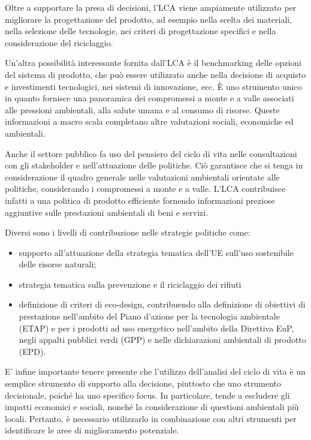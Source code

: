 Oltre a supportare la presa di decisioni, l'LCA viene ampiamente utilizzato per migliorare la progettazione del prodotto, ad esempio nella scelta dei materiali, nella selezione delle tecnologie, nei criteri di progettazione specifici e nella considerazione del riciclaggio.

Un'altra possibilità interessante fornita dall'LCA è il benchmarking delle opzioni del sistema di prodotto, che può essere utilizzato anche nella decisione di acquisto e investimenti tecnologici, nei sistemi di innovazione, ecc. È uno strumento unico in quanto fornisce una panoramica dei compromessi a monte e a valle associati alle pressioni ambientali, alla salute umana e al consumo di risorse. Queste informazioni a macro scala completano altre valutazioni sociali, economiche ed ambientali.

Anche il settore pubblico fa uso del pensiero del ciclo di vita nelle consultazioni con gli stakeholder e nell'attuazione delle politiche. Ciò garantisce che si tenga in considerazione il quadro generale nelle valutazioni ambientali orientate alle politiche, considerando i compromessi a monte e a valle. L'LCA contribuisce infatti a una politica di prodotto efficiente fornendo informazioni preziose aggiuntive sulle prestazioni ambientali di beni e servizi.

Diversi sono i livelli di contribuzione nelle strategie politiche come:

\begin{itemize}
    \item supporto all'attuazione della strategia tematica dell'UE sull'uso sostenibile delle risorse naturali\cite{EuropaSustaineble};
    \item strategia tematica sulla prevenzione e il riciclaggio dei rifiuti
    \item definizione di criteri di eco-design, contribuendo alla definizione di obiettivi di prestazione nell'ambito del Piano d'azione per la tecnologia ambientale (ETAP) e per i prodotti ad uso energetico nell'ambito della Direttiva EuP, negli appalti pubblici verdi (GPP) e nelle dichiarazioni ambientali di prodotto (EPD).
\end{itemize}
E' infine importante tenere presente che l'utilizzo dell'analisi del ciclo di vita è un semplice strumento di supporto alla decisione, piuttosto che uno strumento decisionale, poiché ha uno specifico focus. In particolare, tende a escludere gli impatti economici e sociali, nonché la considerazione di questioni ambientali più locali. Pertanto, è necessario utilizzarlo in combinazione con altri strumenti per identificare le aree di miglioramento potenziale.